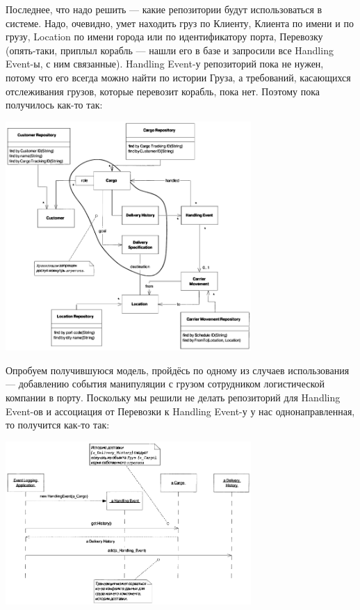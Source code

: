 \documentclass[a5paper]{article}
\begin{document}
Последнее, что надо решить --- какие репозитории будут использоваться в системе. Надо, очевидно, умет находить груз по Клиенту, Клиента по имени и по грузу, Location по имени города или по идентификатору порта, Перевозку (опять-таки, приплыл корабль --- нашли его в базе и запросили все Handling Event-ы, с ним связанные). Handling Event-у репозиторий пока не нужен, потому что его всегда можно найти по истории Груза, а требований, касающихся отслеживания грузов, которые перевозит корабль, пока нет. Поэтому пока получилось как-то так:

\begin{center}
    \includegraphics[width=0.7\textwidth]{cargoRepositories.png}
\end{center}

Опробуем получившуюся модель, пройдёсь по одному из случаев использования --- добавлению события манипуляции с грузом сотрудником логистической компании в порту. Поскольку мы решили не делать репозиторий для Handling Event-ов и ассоциация от Перевозки к Handling Event-у у нас однонаправленная, то получится как-то так:

\begin{center}
    \includegraphics[width=0.7\textwidth]{cargoAddEvent.png}
\end{center}
\end{document}
